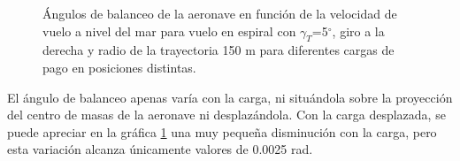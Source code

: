 \begin{figure}
	\centering
	\caption{Ángulos de balanceo de la aeronave en función de la velocidad de vuelo a nivel del mar para vuelo en espiral con $\gamma_T$=5$^\circ$, giro a la derecha y radio de la trayectoria 150 m para diferentes cargas de pago en posiciones distintas.}
	\label{PhiVEMPL}
\end{figure}

El ángulo de balanceo apenas varía con la carga, ni situándola sobre la proyección del centro de masas de la aeronave ni desplazándola. Con la carga desplazada, se puede apreciar en la gráfica \ref{PhiVEMPL} una muy pequeña disminución con la carga, pero esta variación alcanza únicamente valores de 0.0025 rad.

